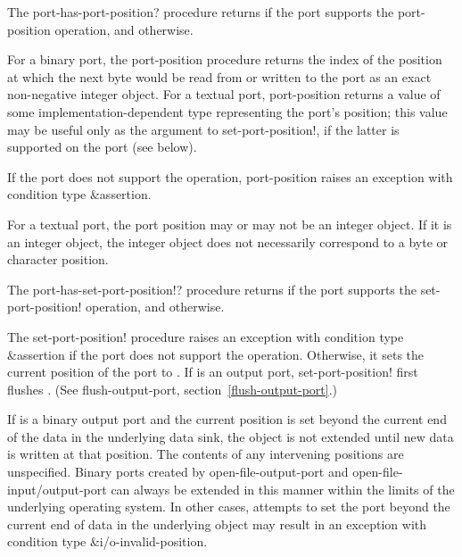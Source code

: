 \begin{entry}{%
}

The {\cf port-has-port-position?} procedure returns \schtrue{} if the
port supports the {\cf port-position} operation, and \schfalse{}
otherwise.

For a binary port, the {\cf port-position} procedure returns the index
of the position at which the next byte would be read from or written
to the port as an exact non-negative integer object.  For a textual
port, {\cf port-position} returns a value of some implementation-dependent
type representing the port's position; this value may be useful only as
the  argument to {\cf set-port-position!}, if the latter is
supported on the port (see below).

If the port does not support the operation, {\cf port-position} raises
an exception with condition type {\cf\&assertion}.

\begin{note}
  For a textual port, the port position may or may not be an integer
  object.  If it is an integer object, the integer object does not
  necessarily correspond to a byte or character position.
\end{note}
\end{entry}   

\begin{entry}{%
}

   
The {\cf port-has-set-port-position!?} procedure returns \schtrue{} if the port
supports the {\cf set-port-position!} operation, and \schfalse{}
otherwise.
   
The {\cf set-port-position!} procedure raises an
exception with condition type {\cf\&assertion}
if the port does not support the operation.
Otherwise, it sets the current position
of the port to .  If  is an output
port, {\cf set-port-position!} first flushes .  (See {\cf
  flush-output-port}, section~\ref{flush-output-port}.)

If  is a binary output port and the current position is set
beyond the current end of the data in the underlying data sink, the object is
not extended until new data is written at that position.
The contents of any intervening positions are unspecified.
Binary ports created by {\cf open-file-output-port} and
{\cf open-file-input/output-port} can always be extended in this manner
within the limits of the underlying operating system.
In other cases, attempts to set the port beyond the current end of data
in the underlying object may result in an exception with condition
type {\cf\&i/o-invalid-position}.
\end{entry}

